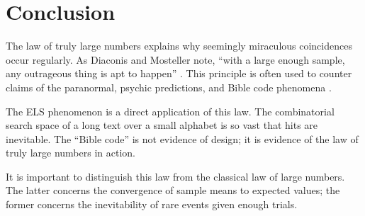 \documentclass[11pt]{amsart}
\theoremstyle{plain}
\theoremstyle{remark}
\begin{document}
\section{Conclusion}

The law of truly large numbers explains why seemingly miraculous
coincidences occur regularly. As Diaconis and Mosteller note, ``with a
large enough sample, any outrageous thing is apt to happen''
\cite{diaconis1989}. This principle is often used to counter claims of the
paranormal, psychic predictions, and Bible code phenomena \cite{wikipedia}.

The ELS phenomenon is a direct application of this law. The combinatorial
search space of a long text over a small alphabet is so vast that hits are
inevitable. The ``Bible code'' is not evidence of design; it is evidence of
the law of truly large numbers in action.

It is important to distinguish this law from the classical law of large
numbers. The latter concerns the convergence of sample means to expected
values; the former concerns the inevitability of rare events given enough
trials.
\end{document}
